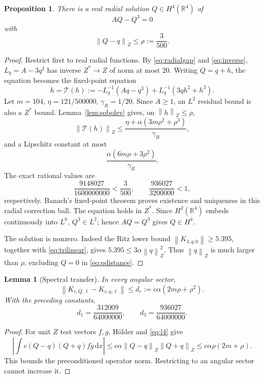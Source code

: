 \documentclass[11pt,a4paper]{article}
\newtheorem{lemma}[theorem]{Lemma}
\newtheorem{proposition}[theorem]{Proposition}
\theoremstyle{definition}\newtheorem{definition}[theorem]{Definition}
\theoremstyle{remark}\newtheorem{remark}[theorem]{Remark}
\newcommand{\R}{\mathbb R}
\newcommand{\dd}{\,\mathrm d}
\newcommand{\norm}[1]{\left\|#1\right\|}
\begin{document}
\begin{proposition}\label{prop:stationary}
There is a real radial solution \(Q\in H^4(\R^4)\) of
\begin{equation}\label{eq:stationary}
 AQ-Q^3=0
\end{equation}
with
\begin{equation}\label{eq:qdistance}
 \norm{Q-q}_Z\le\rho:=\frac3{500}.
\end{equation}
\end{proposition}
\begin{proof}
Restrict first to real radial functions. By \eqref{eq:radialgap} and \eqref{eq:inverse}, \(L_q=A-3q^2\) has inverse \(Z^*\to Z\) of norm at most 20. Writing \(Q=q+h\), the equation becomes the fixed-point equation
\[
 h=\mathcal T(h):=-L_q^{-1}(Aq-q^3)+L_q^{-1}(3qh^2+h^3).
\]
Let \(m=104\), \(\eta=121/500000\), \(\gamma_R=1/20\). Since \(A\ge1\), an \(L^2\) residual bound is also a \(Z^*\) bound. Lemma~\ref{lem:sobolev} gives, on \(\norm h_Z\le\rho\),
\[
 \norm{\mathcal T(h)}_Z\le
 \frac{\eta+\alpha(3m\rho^2+\rho^3)}{\gamma_R},
\]
and a Lipschitz constant at most
\[
 \frac{\alpha(6m\rho+3\rho^2)}{\gamma_R}.
\]
The exact rational values are
\begin{equation}\label{eq:newtonnumbers}
 \frac{9148027}{1600000000}<\frac3{500},\qquad
 \frac{936027}{3200000}<1,
\end{equation}
respectively. Banach's fixed-point theorem proves existence and uniqueness in this radial correction ball. The equation holds in \(Z^*\). Since \(H^2(\R^4)\) embeds continuously into \(L^6\), \(Q^3\in L^2\); hence \(AQ=Q^3\) gives \(Q\in H^4\).

The solution is nonzero. Indeed the Ritz lower bound \(\norm{K_{3,q,0}}\ge5.395\), together with \eqref{eq:trilinear}, gives \(5.395\le3\alpha\norm q_Z^2\). Thus \(\norm q_Z\) is much larger than \(\rho\), excluding \(Q=0\) in \eqref{eq:qdistance}.
\end{proof}

\begin{lemma}[Spectral transfer]\label{lem:transfer}
In every angular sector,
\begin{equation}\label{eq:potentialperturb}
 \norm{K_{c,Q,\ell}-K_{c,q,\ell}}
 \le d_c:=c\alpha(2m\rho+\rho^2).
\end{equation}
With the preceding constants,
\begin{equation}\label{eq:dvalues}
 d_1=\frac{312009}{64000000},\qquad
 d_3=\frac{936027}{64000000}.
\end{equation}
\end{lemma}
\begin{proof}
For unit \(Z\) test vectors \(f,g\), H\"older and \eqref{eq:l4} give
\[
 \left|\int c(Q-q)(Q+q)f\overline g\dd x\right|
 \le c\alpha\norm{Q-q}_Z\norm{Q+q}_Z
 \le c\alpha\rho(2m+\rho).
\]
This bounds the preconditioned operator norm. Restricting to an angular sector cannot increase it.
\end{proof}
\end{document}
